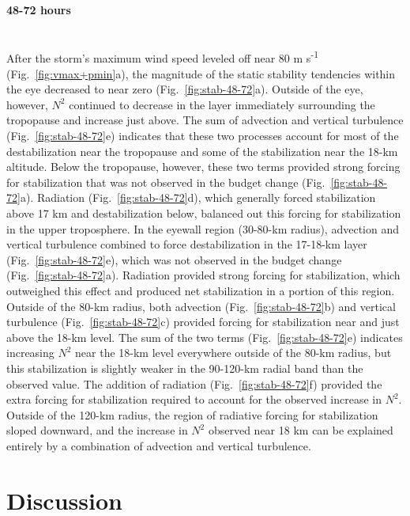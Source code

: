 \paragraph{48-72 hours}\mbox{}\\
\indent After the storm's maximum wind speed leveled off near 80 m s\textsuperscript{-1} (Fig.~\ref{fig:vmax+pmin}a), the magnitude of the static stability tendencies within the eye decreased to near zero (Fig.~\ref{fig:stab-48-72}a).
Outside of the eye, however, $N^2$ continued to decrease in the layer immediately surrounding the tropopause and increase just above.
The sum of advection and vertical turbulence (Fig.~\ref{fig:stab-48-72}e) indicates that these two processes account for most of the destabilization near the tropopause and some of the stabilization near the 18-km altitude.
Below the tropopause, however, these two terms provided strong forcing for stabilization that was not observed in the budget change (Fig.~\ref{fig:stab-48-72}a).
Radiation (Fig.~\ref{fig:stab-48-72}d), which generally forced stabilization above 17 km and destabilization below, balanced out this forcing for stabilization in the upper troposphere.
In the eyewall region (30-80-km radius), advection and vertical turbulence combined to force destabilization in the 17-18-km layer (Fig.~\ref{fig:stab-48-72}e), which was not observed in the budget change (Fig.~\ref{fig:stab-48-72}a).
Radiation provided strong forcing for stabilization, which outweighed this effect and produced net stabilization in a portion of this region.
Outside of the 80-km radius, both advection (Fig.~\ref{fig:stab-48-72}b) and vertical turbulence (Fig.~\ref{fig:stab-48-72}c) provided forcing for stabilization near and just above the 18-km level.
The sum of the two terms (Fig.~\ref{fig:stab-48-72}e) indicates increasing $N^2$ near the 18-km level everywhere outside of the 80-km radius, but this stabilization is slightly weaker in the 90-120-km radial band than the observed value.
The addition of radiation (Fig.~\ref{fig:stab-48-72}f) provided the extra forcing for stabilization required to account for the observed increase in $N^2$.
Outside of the 120-km radius, the region of radiative forcing for stabilization sloped downward, and the increase in $N^2$ observed near 18 km can be explained entirely by a combination of advection and vertical turbulence.

\section{Discussion}

